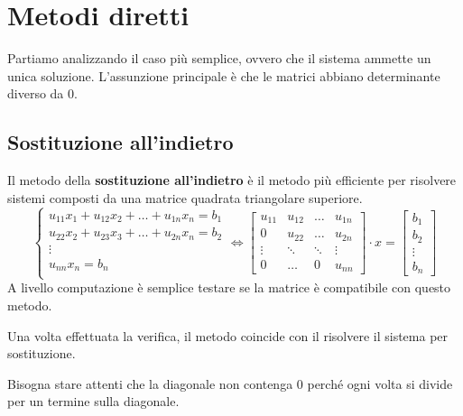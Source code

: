 \section{Metodi diretti}
Partiamo analizzando il caso più semplice, ovvero che il sistema ammette un unica
soluzione. L'assunzione principale è che le matrici abbiano determinante diverso
da $0$.
\subsection{Sostituzione all'indietro}
Il metodo della \textbf{sostituzione all'indietro} è il metodo più efficiente per
risolvere sistemi composti da una matrice quadrata triangolare superiore.
\begin{equation}
    \begin{cases}
        u_{11}x_1 + u_{12} x_2 + \dots + u_{1n} x_n= b_1 \\
        u_{22}x_2 + u_{23} x_3 + \dots + u_{2n} x_n= b_2 \\
        \vdots                                           \\
        u_{nn}x_n = b_n                                  \\
    \end{cases} \iff \left[\begin{array}{cccc}
            u_{11} & u_{12} & \dots  & u_{1n} \\
            0      & u_{22} & \dots  & u_{2n} \\
            \vdots & \ddots & \ddots & \vdots \\
            0      & \dots  & 0      & u_{nn}
        \end{array} \right] \cdot x = \left[\begin{array}{c}
            b_1    \\
            b_2    \\
            \vdots \\
            b_n
        \end{array}\right]
\end{equation}
A livello computazione è semplice testare se la matrice è compatibile con questo
metodo.

Una volta effettuata la verifica, il metodo coincide con il risolvere il sistema
per sostituzione.
\begin{nota}
    Bisogna stare attenti che la diagonale non contenga $0$ perché ogni volta
    si divide per un termine sulla diagonale.
\end{nota}

